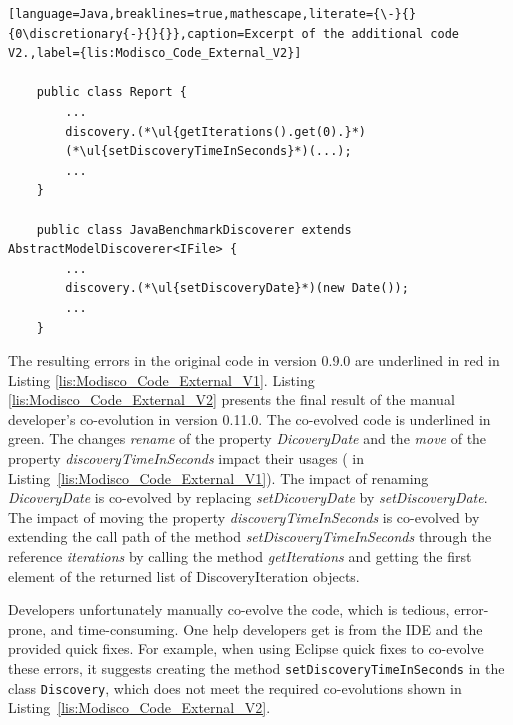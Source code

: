 \begin{lstlisting}[language=Java,breaklines=true,mathescape,literate={\-}{}{0\discretionary{-}{}{}},caption=Excerpt of the additional code V2.,label={lis:Modisco_Code_External_V2}]
	
	public class Report {
		...
		discovery.(*\ul{getIterations().get(0).}*) 
		(*\ul{setDiscoveryTimeInSeconds}*)(...);
		...
	}
	
	public class JavaBenchmarkDiscoverer extends AbstractModelDiscoverer<IFile> {
		...
		discovery.(*\ul{setDiscoveryDate}*)(new Date());
		...
	}
\end{lstlisting}




The resulting errors in the original code in version 0.9.0 are underlined in red in Listing \ref{lis:Modisco_Code_External_V1}. Listing \ref{lis:Modisco_Code_External_V2} presents the final result of the manual developer's co-evolution in version 0.11.0. The co-evolved code is underlined in green. 
The changes \textit{rename} of the property \textit{ DicoveryDate} and the \textit{move} of the property \emph{discoveryTimeInSeconds} impact their usages ({\small{}} in Listing~\ref{lis:Modisco_Code_External_V1}). The impact of renaming \textit{ DicoveryDate} is co-evolved by replacing \textit{setDicoveryDate} by \textit{setDiscoveryDate}. The impact of moving the property \emph{discoveryTimeInSeconds} is co-evolved by extending the call path of the method \emph{setDiscoveryTimeInSeconds} through the reference \textit{iterations} by calling the method \textit{getIterations} and getting the first element of the returned list of DiscoveryIteration objects.

Developers unfortunately manually co-evolve the code, which is tedious, error-prone, and time-consuming. 
One help developers get is from the IDE and the provided quick fixes. For example, when using Eclipse quick fixes to co-evolve these errors, it suggests creating the method \texttt{setDiscoveryTimeInSeconds} in the class \texttt{Discovery}, which does not meet the required co-evolutions shown in Listing~\ref{lis:Modisco_Code_External_V2}.

